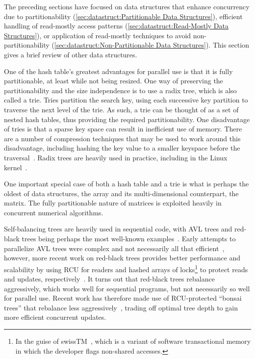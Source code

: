 The preceding sections have focused on data structures that enhance
concurrency due to partitionability
(\cref{sec:datastruct:Partitionable Data Structures}),
efficient handling of read-mostly access patterns
(\cref{sec:datastruct:Read-Mostly Data Structures}),
or application of read-mostly techniques to avoid
non-partitionability
(\cref{sec:datastruct:Non-Partitionable Data Structures}).
This section gives a brief review of other data structures.

One of the hash table's greatest advantages for parallel use is that it
is fully partitionable, at least while not being resized.
One way of preserving the partitionability and the size independence is
to use a radix tree, which is also called a trie.
Tries partition the search key, using each successive key partition
to traverse the next level of the trie.
As such, a trie can be thought of as a set of nested hash tables,
thus providing the required partitionability.
One disadvantage of tries is that a sparse key space can result in
inefficient use of memory.
There are a number of compression techniques that may be used to
work around this disadvantage, including hashing the key value to
a smaller keyspace before the
traversal~\cite{RobertOlsson2007Trash}.
Radix trees are heavily used in practice, including in the Linux
kernel~\cite{NickPiggin2006radixtree}.

One important special case of both a hash table and a trie is what is
perhaps the oldest of data structures, the array and its multi-dimensional
counterpart, the matrix.
The fully partitionable nature of matrices is exploited heavily in
concurrent numerical algorithms.

Self-balancing trees are heavily used in sequential code, with
AVL trees and red-black trees being perhaps the most well-known
examples~\cite{ThomasHCorman2001Algorithms}.
Early attempts to parallelize AVL trees were complex and not necessarily
all that efficient~\cite{Ellis80},
however, more recent work on red-black trees provides better
performance and scalability by using RCU for readers and hashed arrays
of locks\footnote{
	In the guise of swissTM~\cite{AleksandarDragovejic2011STMnotToy},
	which is a variant of software transactional memory in which
	the developer flags non-shared accesses.}
to protect reads and updates,
respectively~\cite{PhilHoward2011RCUTMRBTree,PhilipWHoward2013RCUrbtree}.
It turns out that red-black trees rebalance aggressively, which works
well for sequential programs, but not necessarily so well for parallel
use.
Recent work has therefore made use of RCU-protected ``bonsai trees''
that rebalance less aggressively~\cite{AustinClements2012RCULinux:mmapsem},
trading off optimal tree depth to gain more efficient concurrent updates.

